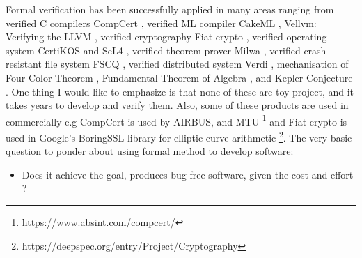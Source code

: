   
	
		    
	Formal verification has been successfully applied in many areas ranging 
	from verified C compilers CompCert \citep{DBLP:conf/popl/Leroy06}, verified ML compiler
	CakeML \citep{Kumar:2014:CVI}, Vellvm: Verifying the LLVM 
	\citep{10.1007/978-3-642-35308-6_6}, verified cryptography 
	Fiat-crypto \citep{DBLP:conf/sp/ErbsenPGSC19}, verified 
	operating system CertiKOS \citep{DBLP:conf/apsys/GuVFSC11} and 
	SeL4 \citep{DBLP:conf/sosp/KleinEHACDEEKNSTW09}, verified theorem 
	prover Milwa \citep{DBLP:conf/itp/MyreenD14}, 
	verified crash resistant file system FSCQ \citep{Chen:2015:UCH:2815400.2815402}, 
	verified distributed system 
	Verdi \citep{DBLP:conf/pldi/WilcoxWPTWEA15} , mechanisation of 
	Four Color Theorem \citep{10.1007/978-3-540-87827-8_28}, 
	Fundamental Theorem of 
	Algebra \citep{10.1007/3-540-45842-5_7}, and Kepler Conjecture \citep{hales-kepler}.
	One thing I would like to emphasize 
	is that none of these are toy project, and it takes years 
	to develop and verify them. Also, some of these products 
	are used in commercially e.g CompCert is used by AIRBUS, and MTU
	\footnote{https://www.absint.com/compcert/} and Fiat-crypto is used 
	in Google's BoringSSL library for elliptic-curve arithmetic 
	\footnote{https://deepspec.org/entry/Project/Cryptography}. 
	The very basic question to ponder about using formal method to develop 
	software: 
	\begin{itemize}
	\item Does it achieve the goal, produces bug free software,  given the cost and effort ?
\end{itemize}	 
	

